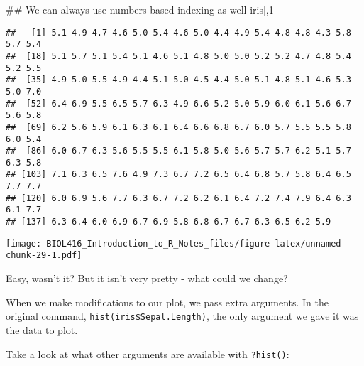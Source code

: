 \documentclass[]{article}
\newenvironment{Shaded}{\begin{snugshade}}{\end{snugshade}}
\newcommand{\KeywordTok}[1]{\textcolor[rgb]{0.13,0.29,0.53}{\textbf{#1}}}
\newcommand{\DataTypeTok}[1]{\textcolor[rgb]{0.13,0.29,0.53}{#1}}
\newcommand{\DecValTok}[1]{\textcolor[rgb]{0.00,0.00,0.81}{#1}}
\newcommand{\StringTok}[1]{\textcolor[rgb]{0.31,0.60,0.02}{#1}}
\newcommand{\CommentTok}[1]{\textcolor[rgb]{0.56,0.35,0.01}{\textit{#1}}}
\newcommand{\OperatorTok}[1]{\textcolor[rgb]{0.81,0.36,0.00}{\textbf{#1}}}
\newcommand{\AlertTok}[1]{\textcolor[rgb]{0.94,0.16,0.16}{#1}}
\newcommand{\NormalTok}[1]{#1}
\begin{document}
\begin{Shaded}
\begin{Highlighting}[]
\NormalTok{## We can always use numbers-based indexing as well}
\NormalTok{iris[,}\DecValTok{1}\NormalTok{]}
\end{Highlighting}
\end{Shaded}

\begin{verbatim}
##   [1] 5.1 4.9 4.7 4.6 5.0 5.4 4.6 5.0 4.4 4.9 5.4 4.8 4.8 4.3 5.8 5.7 5.4
##  [18] 5.1 5.7 5.1 5.4 5.1 4.6 5.1 4.8 5.0 5.0 5.2 5.2 4.7 4.8 5.4 5.2 5.5
##  [35] 4.9 5.0 5.5 4.9 4.4 5.1 5.0 4.5 4.4 5.0 5.1 4.8 5.1 4.6 5.3 5.0 7.0
##  [52] 6.4 6.9 5.5 6.5 5.7 6.3 4.9 6.6 5.2 5.0 5.9 6.0 6.1 5.6 6.7 5.6 5.8
##  [69] 6.2 5.6 5.9 6.1 6.3 6.1 6.4 6.6 6.8 6.7 6.0 5.7 5.5 5.5 5.8 6.0 5.4
##  [86] 6.0 6.7 6.3 5.6 5.5 5.5 6.1 5.8 5.0 5.6 5.7 5.7 6.2 5.1 5.7 6.3 5.8
## [103] 7.1 6.3 6.5 7.6 4.9 7.3 6.7 7.2 6.5 6.4 6.8 5.7 5.8 6.4 6.5 7.7 7.7
## [120] 6.0 6.9 5.6 7.7 6.3 6.7 7.2 6.2 6.1 6.4 7.2 7.4 7.9 6.4 6.3 6.1 7.7
## [137] 6.3 6.4 6.0 6.9 6.7 6.9 5.8 6.8 6.7 6.7 6.3 6.5 6.2 5.9
\end{verbatim}

\begin{Shaded}
\end{Shaded}

\texttt{[image: BIOL416\_Introduction\_to\_R\_Notes\_files/figure-latex/unnamed-chunk-29-1.pdf]}

Easy, wasn't it? But it isn't very pretty - what could we change?

When we make modifications to our plot, we pass extra arguments. In the
original command, \texttt{hist(iris\$Sepal.Length)}, the only argument
we gave it was the data to plot.

Take a look at what other arguments are available with \texttt{?hist()}:

\begin{Shaded}
\end{Shaded}
\end{document}
